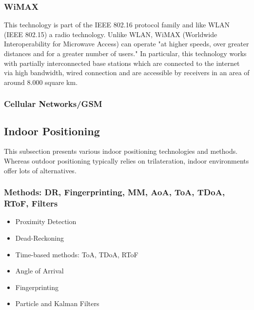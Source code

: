 
\subsubsection{WiMAX}
This technology is part of the IEEE 802.16 protocol family and like WLAN (IEEE 802.15) a radio technology. Unlike WLAN, WiMAX (Worldwide Interoperability for Microwave Access) can operate "at higher speeds, over greater distances and for a greater number of users." \cite{wimax} In particular, this technology works with partially interconnected base stations which are connected to the internet via high bandwidth, wired connection and are accessible by receivers in an area of around 8.000 square km.


\subsubsection{Cellular Networks/GSM}

\subsection{Indoor Positioning}

This subsection presents various indoor positioning technologies and methods.
Whereas outdoor positioning typically relies on trilateration, indoor environments offer lots of alternatives.

\subsubsection{Methods: DR, Fingerprinting, MM, AoA, ToA, TDoA, RToF, Filters}
\begin{itemize}
	\item Proximity Detection
	
	\item Dead-Reckoning
	
	\item Time-based methods: ToA, TDoA, RToF
	
	\item Angle of Arrival
	
	\item Fingerprinting
	
	\item Particle and Kalman Filters
	
\end{itemize}

